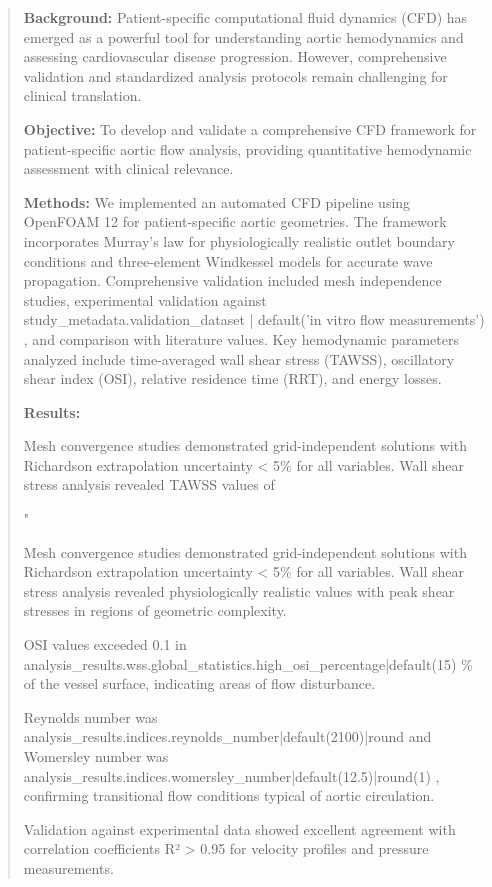 
\begin{abstract}

\textbf{Background:} Patient-specific computational fluid dynamics (CFD) has emerged as a powerful tool for understanding aortic hemodynamics and assessing cardiovascular disease progression. However, comprehensive validation and standardized analysis protocols remain challenging for clinical translation.

\textbf{Objective:} To develop and validate a comprehensive CFD framework for patient-specific aortic flow analysis, providing quantitative hemodynamic assessment with clinical relevance.

\textbf{Methods:} We implemented an automated CFD pipeline using OpenFOAM 12 for patient-specific aortic geometries. The framework incorporates Murray's law for physiologically realistic outlet boundary conditions and three-element Windkessel models for accurate wave propagation. Comprehensive validation included mesh independence studies, experimental validation against {{ study_metadata.validation_dataset | default('in vitro flow measurements') }}, and comparison with literature values. Key hemodynamic parameters analyzed include time-averaged wall shear stress (TAWSS), oscillatory shear index (OSI), relative residence time (RRT), and energy losses.

\textbf{Results:} 
{%
Mesh convergence studies demonstrated grid-independent solutions with Richardson extrapolation uncertainty < 5\% for all variables. Wall shear stress analysis revealed TAWSS values of {{ "%
{%
Mesh convergence studies demonstrated grid-independent solutions with Richardson extrapolation uncertainty < 5\% for all variables. Wall shear stress analysis revealed physiologically realistic values with peak shear stresses in regions of geometric complexity.
{%
OSI values exceeded 0.1 in {{ analysis_results.wss.global_statistics.high_osi_percentage|default(15) }}\% of the vessel surface, indicating areas of flow disturbance. 
{%
Reynolds number was {{ analysis_results.indices.reynolds_number|default(2100)|round }} and Womersley number was {{ analysis_results.indices.womersley_number|default(12.5)|round(1) }}, confirming transitional flow conditions typical of aortic circulation.
{%
Validation against experimental data showed excellent agreement with correlation coefficients R² > 0.95 for velocity profiles and pressure measurements.

}}}}}}}
\end{abstract}
